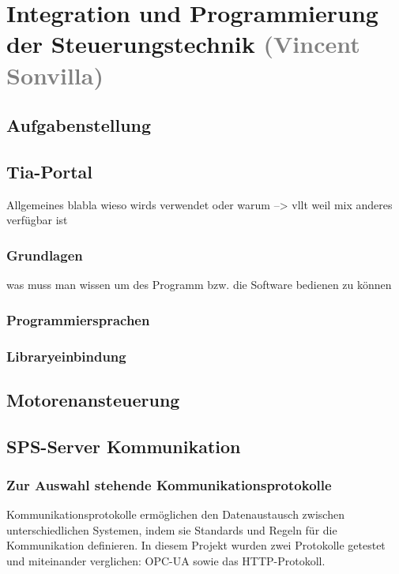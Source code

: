 \section{Integration und Programmierung der Steuerungstechnik \textcolor{gray}{ (Vincent Sonvilla)}}


\subsection{Aufgabenstellung}

\subsection{Tia-Portal}

Allgemeines blabla
wieso wirds verwendet oder warum --> vllt weil mix anderes verfügbar ist

    \subsubsection{Grundlagen}
    was muss man wissen um des Programm bzw. die Software bedienen zu können

    \subsubsection{Programmiersprachen}

    \subsubsection{Libraryeinbindung}
    \label{Libraryeinbindung}

\subsection{Motorenansteuerung}

\subsection{SPS-Server Kommunikation}

    \subsubsection{Zur Auswahl stehende Kommunikationsprotokolle} 
    \label{Kommunikationsprotokolle}

    Kommunikationsprotokolle ermöglichen den Datenaustausch zwischen unterschiedlichen Systemen, indem sie Standards und Regeln für die Kommunikation definieren. In diesem Projekt wurden zwei Protokolle getestet und miteinander verglichen: OPC-UA sowie das HTTP-Protokoll.


